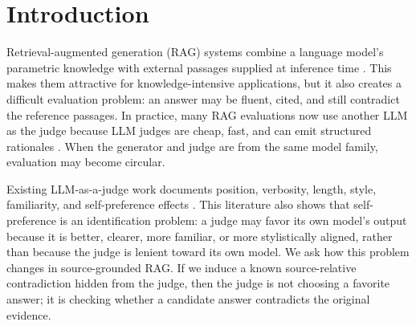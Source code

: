 \begin{abstract}
LLM-as-a-judge evaluation is widely used for retrieval-augmented generation (RAG), but reusing a model as generator and judge complicates identifying self-leniency. We introduce \method, a controlled meta-evaluation protocol for source-grounded RAG. Starting from GaRAGe, we induce one hidden answer-causal contradiction per record, generate answers from perturbed passages with GPT, Grok, and Gemini, and use the same models as blind judges against the original passages. The experiment contains 300 core records, 897 labeled outputs, and 2,683 verdicts in a crossed $3\times3$ matrix; the primary analysis uses 275 validated records. We estimate same-model effects by pairing judges on the exact same candidate answer. Diagonal and off-diagonal F1 are similar, and aggregate paired recall is near zero for the three tested endpoints ($-0.5$ pp; 95\% cluster-bootstrap CI $[-2.7,+1.7]$). Matching judges flag answers that avoided the induced claim less often ($-4.3$ pp). A targeted human evaluation classifies reviewed apparent false positives as alternate source-error detections, adoption-label mistakes, or unclear cases; none were adjudicated as genuine false alarms. We recommend full matrices, answer-paired effects, behavior strata, and label-task alignment.
\end{abstract}

\section{Introduction}

Retrieval-augmented generation (RAG) systems combine a language model's parametric knowledge with external passages supplied at inference time \citep{lewis2020rag}. This makes them attractive for knowledge-intensive applications, but it also creates a difficult evaluation problem: an answer may be fluent, cited, and still contradict the reference passages. In practice, many RAG evaluations now use another LLM as the judge because LLM judges are cheap, fast, and can emit structured rationales \citep{liu2023geval,zheng2023judging,kim2023prometheus}. When the generator and judge are from the same model family, evaluation may become circular.

Existing LLM-as-a-judge work documents position, verbosity, length, style, familiarity, and self-preference effects \citep{dubois2024length,shi2024position,liu2024narcissistic,wataoka2024selfpreference,ye2024justice,spiliopoulou2025playfavorites}. This literature also shows that self-preference is an identification problem: a judge may favor its own model's output because it is better, clearer, more familiar, or more stylistically aligned, rather than because the judge is lenient toward its own model. We ask how this problem changes in source-grounded RAG. If we induce a known source-relative contradiction hidden from the judge, then the judge is not choosing a favorite answer; it is checking whether a candidate answer contradicts the original evidence.

